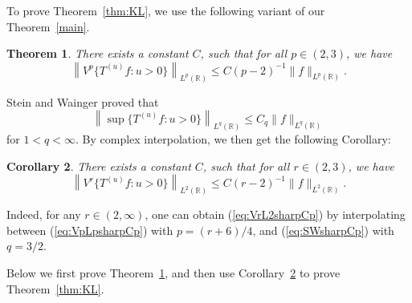 \documentclass[12pt,leqno]{amsart}
\def\R{\mathbb{R}}
\def\beq{\begin{equation}}
\def\endeq{\end{equation}}
\theoremstyle{plain}
\newtheorem{thm}{Theorem}[section]
\newtheorem{cor}[thm]{Corollary}
\numberwithin{equation}{section}
\begin{document}
To prove Theorem~\ref{thm:KL}, we use the following variant of our Theorem~\ref{main}.

\begin{thm} \label{thm:mainsharpCp}
There exists a constant $C$, such that for all $p \in (2,3)$, we have
\beq \label{eq:VpLpsharpCp}
\left \| V^p \{T^{(u)} f \colon u > 0\} \right \|_{L^p(\R)} \leq C (p-2)^{-1} \|f\|_{L^p(\R)}.
\endeq
\end{thm}

Stein and Wainger proved that
\beq \label{eq:SWsharpCp}
\left \| \sup \{T^{(u)} f \colon u > 0\} \right \|_{L^q(\R)} \leq C_q \|f\|_{L^q(\R)}
\endeq
for $1 < q < \infty$. By complex interpolation, we then get the following Corollary:

\begin{cor} \label{cor:mainsharpCp}
There exists a constant $C$, such that for all $r \in (2,3)$, we have
\beq \label{eq:VrL2sharpCp}
\left \| V^r \{T^{(u)} f \colon u > 0\} \right \|_{L^2(\R)} \leq C (r-2)^{-1} \|f\|_{L^2(\R)}.
\endeq
\end{cor}

Indeed, for any $r \in (2,\infty)$, one can obtain (\ref{eq:VrL2sharpCp}) by interpolating between (\ref{eq:VpLpsharpCp}) with $p = (r+6)/4$, and (\ref{eq:SWsharpCp}) with $q = 3/2$.

Below we first prove Theorem~\ref{thm:mainsharpCp}, and then use Corollary~\ref{cor:mainsharpCp} to prove Theorem~\ref{thm:KL}.
\end{document}
